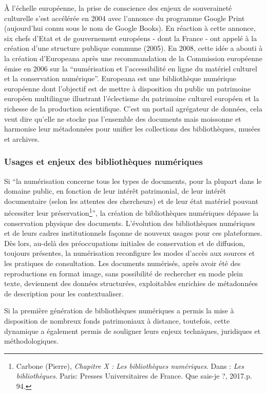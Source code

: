 À l’échelle européenne, la prise de conscience des enjeux de souveraineté culturelle s’est accélérée en 2004 avec l’annonce du programme Google Print (aujourd’hui connu sous le nom de Google Books). En réaction à cette annonce, six chefs d’Etat et de gouvernement européens - dont la France - ont appelé à la création d’une structure publique commune (2005). 
En 2008, cette idée a abouti à la création d’Europeana après une recommandation de la Commission européenne émise en 2006 sur la \enquote{numérisation et l’accessibilité en ligne du matériel culturel et la conservation numérique}.
Europeana est une bibliothèque numérique européenne dont l’objectif est de mettre à disposition du public un patrimoine européen multilingue illustrant l’éclectisme du patrimoine culturel européen et la richesse de la production scientifique. C’est un portail agrégateur de données, cela veut dire qu’elle ne stocke pas l’ensemble des documents mais moissonne et harmonise leur métadonnées pour unifier les collections des bibliothèques, musées et archives.

\subsubsection*{Usages et enjeux des bibliothèques numériques}

Si \enquote{la numérisation concerne tous les types de documents, pour la plupart dans le domaine public, en fonction de leur intérêt patrimonial, de leur intérêt documentaire (selon les attentes des chercheurs) et de leur état matériel pouvant nécessiter leur préservation\footnote{Carbone (Pierre), \textit{Chapitre X : Les bibliothèques numériques}. Dans : \textit{Les bibliothèques}. Paris: Presses Universitaires de France. Que sais-je ?, 2017.p. 94.}}, la création de bibliothèques numériques dépasse la conservation physique des documents. 
L'évolution des bibliothèques numériques et de leurs cadres institutionnels façonne de nouveux usages pour ces plateformes. 
Dès lors, au-delà des préoccupations initiales de conservation et de diffusion, toujours présentes, la numérisation reconfigure les modes d'accès aux sources et les pratiques de consultation. 
Les documents numérisés, après avoir été des reproductions en format image, sans possibilité de rechercher en mode plein texte, deviennent des données structurées, exploitables enrichies de métadonnées de description pour les contextualiser. 

Si la première génération de bibliothèques numériques a permis la mise à disposition de nombreux fonds patrimoniaux à distance, toutefois, cette dynamique a également permis de souligner leurs enjeux techniques, juridiques et méthodologiques.

